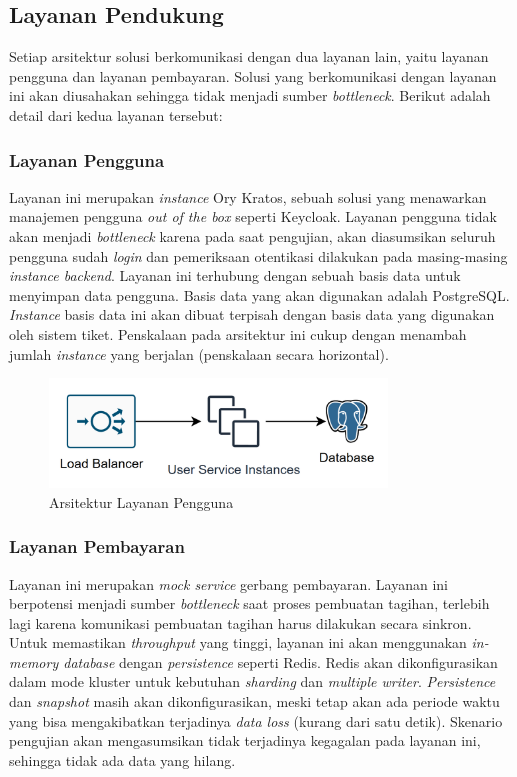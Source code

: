 \subsection{Layanan Pendukung}

Setiap arsitektur solusi berkomunikasi dengan dua layanan lain, yaitu layanan pengguna dan layanan pembayaran. Solusi yang berkomunikasi dengan layanan ini akan diusahakan sehingga tidak menjadi sumber \textit{bottleneck}. Berikut adalah detail dari kedua layanan tersebut:

\subsubsection{Layanan Pengguna}

Layanan ini merupakan \textit{instance} Ory Kratos, sebuah solusi yang menawarkan manajemen pengguna \textit{out of the box} seperti Keycloak. Layanan pengguna tidak akan menjadi \textit{bottleneck} karena pada saat pengujian, akan diasumsikan seluruh pengguna sudah \textit{login} dan pemeriksaan otentikasi dilakukan pada masing-masing \textit{instance backend}. Layanan ini terhubung dengan sebuah basis data untuk menyimpan data pengguna. Basis data yang akan digunakan adalah PostgreSQL. \textit{Instance} basis data ini akan dibuat terpisah dengan basis data yang digunakan oleh sistem tiket. Penskalaan pada arsitektur ini cukup dengan menambah jumlah \textit{instance} yang berjalan (penskalaan secara horizontal).

\begin{figure}[htbp]
    \centering
    \includegraphics[width=0.8\textwidth]{resources/appendix/user-service.png}
    \caption{Arsitektur Layanan Pengguna}
    \label{fig:user-service-deployment}
\end{figure}

\subsubsection{Layanan Pembayaran}

Layanan ini merupakan \textit{mock service} gerbang pembayaran. Layanan ini berpotensi menjadi sumber \textit{bottleneck} saat proses pembuatan tagihan, terlebih lagi karena komunikasi pembuatan tagihan harus dilakukan secara sinkron. Untuk memastikan \textit{throughput} yang tinggi, layanan ini akan menggunakan \textit{in-memory database} dengan \textit{persistence} seperti Redis. Redis akan dikonfigurasikan dalam mode kluster untuk kebutuhan \textit{sharding} dan \textit{multiple writer}. \textit{Persistence} dan \textit{snapshot} masih akan dikonfigurasikan, meski tetap akan ada periode waktu yang bisa mengakibatkan terjadinya \textit{data loss} (kurang dari satu detik). Skenario pengujian akan mengasumsikan tidak terjadinya kegagalan pada layanan ini, sehingga tidak ada data yang hilang.

